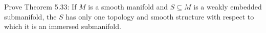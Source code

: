 Prove Theorem 5.33: If $M$ is a smooth manifold and $S \subseteq M$ is a weakly embedded submanifold, the $S$ has only one topology and smooth structure with respect to which it is an immersed submanifold.